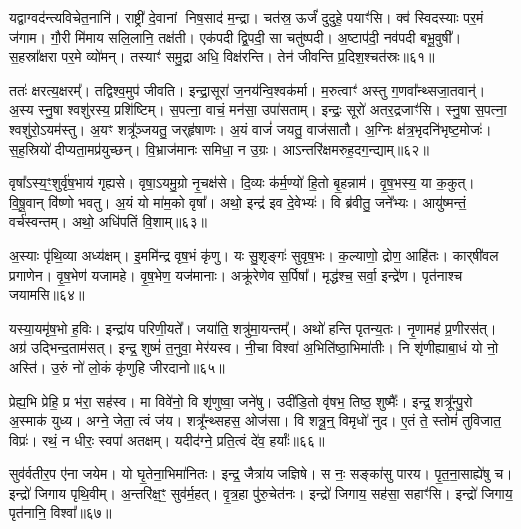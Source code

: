 यद्वाग्वद॑न्त्यविचेत॒नानि॑।
राष्ट्री॑ दे॒वानां निष॒साद॑ म॒न्द्रा।
चत॑स्र॒ ऊर्जं॑ दुदुहे॒ पयाꣳ॑सि।
क्व॑ स्विदस्याः पर॒मं ज॑गाम।
गौ॒री मि॑माय सलि॒लानि॒ तक्ष॑ती।
एक॑पदी द्वि॒पदी॒ सा चतु॑ष्पदी।
अ॒ष्टाप॑दी॒ नव॑पदी बभू॒वुषी᳚।
स॒हस्रा᳚क्षरा पर॒मे व्यो॑मन्।
तस्याꣳ॑ समु॒द्रा अधि॒ विक्ष॑रन्ति।
तेन॑ जीवन्ति प्र॒दिश॒श्चत॑स्रः॥६१॥\ip

ततः॑ क्षरत्य॒क्षरम्᳚।
तद्विश्व॒मुप॑ जीवति।
इन्द्रा॒सूरा॑ ज॒नय॑न्वि॒श्वक॑र्मा।
म॒रुत्वाꣳ॑ अस्तु ग॒णवा᳚न्थ्सजा॒तवान्॑।
अ॒स्य स्नु॒षा श्वशु॑रस्य॒ प्रशि॑ष्टिम्।
स॒पत्ना॒ वाचं॒ मन॑सा॒ उपा॑सताम्।
इन्द्रः॒ सूरो॑ अतर॒द्रजाꣳ॑सि।
स्नु॒षा स॒पत्ना॒ श्वशु॑रो॒\-ऽयम॑स्तु।
अ॒यꣳ शत्रू᳚ञ्जयतु॒ जर्‌\mbox{}हृ॑षाणः।
अ॒यं वाजं॑ जयतु॒ वाज॑सातौ।
अ॒ग्निः क्ष॑त्र॒भृदनि॑भृष्ट॒मोजः॑।
स॒ह॒स्रियो॑ दीप्यता॒मप्र॑युच्छन्।
वि॒भ्राज॑मानः समिधा॒ न उ॒ग्रः।
आऽन्तरि॑क्षमरुह॒दग॒न्द्याम्॥६२॥\ip\anuvakamend[धा॒रय॑न्पुरो॒डाशं॒ बृह॒स्पतिं॑ ज॒घन॑च्युतिमान॒न्दो भग॑स्य तृप्याण्य॒ग्नेः पृ॑थि॒वी यज्व॑न एतु प्र॒दिश॒श्चत॑स्रो॒ वाज॑सातौ च॒त्वारि॑ च]

वृषा᳚\-ऽस्य॒ꣳ॒शुर्वृ॑ष॒भाय॑ गृह्यसे।
वृषा॒\-ऽयमु॒ग्रो नृ॒चक्ष॑से।
दि॒व्यः क॑र्म॒ण्यो॑ हि॒तो बृ॒हन्नाम॑।
वृ॒ष॒भस्य॒ या क॒कुत्।
वि॒षू॒वान् वि॑ष्णो भवतु।
अ॒यं यो मा॑म॒को वृषा᳚।
अथो॒ इन्द्र॑ इव दे॒वेभ्यः॑।
वि ब्र॑वीतु॒ जने᳚भ्यः।
आयु॑ष्मन्तं॒ वर्च॑स्वन्तम्।
अथो॒ अधि॑पतिं वि॒शाम्॥६३॥\ip

अ॒स्याः पृ॑थि॒व्या अध्य॑क्षम्।
इ॒ममि॑न्द्र वृष॒भं कृ॑णु।
यः सु॒शृङ्गः॑ सुवृष॒भः।
क॒ल्याणो॒ द्रोण॒ आहि॑तः।
कार्‌\mbox{}षी॑वल प्रगाणेन।
वृ॒ष॒भेण॑ यजामहे।
वृ॒ष॒भेण॒ यज॑मानाः।
अक्रू॑रेणेव स॒र्पिषा᳚।
मृद्ध॑श्च॒ सर्वा॒ इन्द्रे॑ण।
पृत॑नाश्च जयामसि॥६४॥\ip

यस्या॒यमृ॑ष॒भो ह॒विः।
इन्द्रा॑य परिणी॒यते᳚।
जया॑ति॒ शत्रु॑मा॒यन्तम्᳚।
अथो॑ हन्ति पृतन्य॒तः।
नृ॒णामह॑ प्र॒णीरस॑त्।
अग्र॑ उद्भिन्द॒ताम॑सत्।
इन्द्र॒ शुष्मं॑ त॒नुवा॒ मेर॑यस्व।
नी॒चा विश्वा॑ अ॒भिति॑ष्ठा॒भिमा॑तीः।
नि शृ॑णीह्याबा॒धं यो नो॒ अस्ति॑।
उ॒रुं नो॑ लो॒कं कृ॑णुहि जीरदानो॥६५॥\ip

प्रेह्य॒भि प्रेहि॒ प्र भ॑रा॒ सह॑स्व।
मा विवे॑नो॒ वि शृ॑णुष्वा॒ जने॑षु।
उदी॑डि॒तो वृ॑षभ॒ तिष्ठ॒ शुष्मैः᳚।
इन्द्र॒ शत्रू᳚न्पु॒रो अ॒स्माक॑ युध्य।
अग्ने॒ जेता॒ त्वं ज॑य।
शत्रू᳚न्थ्सहस॒ ओज॑सा।
वि शत्रू॒न्॒ विमृधो॑ नुद।
ए॒तं ते॒ स्तोमं॑ तुविजात॒ विप्रः॑।
रथं॒ न धीरः॒ स्वपा॑ अतक्षम्।
यदीद॑ग्ने॒ प्रति॒त्वं दे॑व॒ हर्याः᳚॥६६॥\ip

सुव॑र्वतीर॒प ए॑ना जयेम।
यो घृ॒तेना॒भिमा॑नितः।
इन्द्र॒ जैत्रा॑य जज्ञिषे।
स नः॒ सङ्का॑सु पारय।
पृ॒त॒ना॒साह्ये॑षु च।
इन्द्रो॑ जिगाय पृथि॒वीम्।
अ॒न्तरि॑क्ष॒ꣳ॒ सुव॑र्म॒हत्।
वृ॒त्र॒हा पु॑रु॒चेत॑नः।
इन्द्रो॑ जिगाय॒ सह॑सा॒ सहाꣳ॑सि।
इन्द्रो॑ जिगाय॒ पृत॑नानि॒ विश्वा᳚॥६७॥\ip

